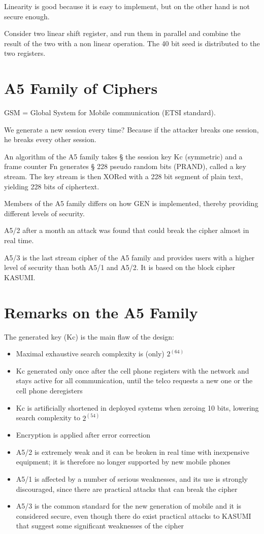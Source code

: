 Linearity is good because it is easy to implement, but on the other hand is not secure enough.


Consider two linear shift register, and run them in parallel and combine the result of the two with a non linear operation. The 40 bit seed is distributed to the two registers.



\section{A5 Family of Ciphers}

GSM = Global System for Mobile communication (ETSI standard).

We generate a new session every time? Because if the attacker breaks one session, he breaks every other session.


An algorithm of the A5 family takes § the session key Kc (symmetric) and a frame counter Fn generates § 228 pseudo random bits (PRAND), called a key stream.
The key stream is then XORed with a 228 bit segment of plain text, yielding 228 bits of ciphertext.

Members of the A5 family differs on how GEN is implemented, thereby providing different levels of security.


A5/2 after a month an attack was found that could break the cipher almost in real time.

A5/3 is the last stream cipher of the A5 family and provides users with a higher level of security than both A5/1 and A5/2. It is based on the block cipher KASUMI. 


\section{Remarks on the A5 Family}

The generated key (Kc) is the main flaw of the design:
\begin{itemize}
	\item Maximal exhaustive search complexity is (only) $2^(64)$
	\item  Kc generated only once after the cell phone registers with the network and stays active for all communication, until the telco requests a new one or the cell phone deregisters 
	\item Kc is artificially shortened in deployed systems when zeroing 10 bits, lowering search complexity to $2^(54)$
	\item Encryption is applied after error correction
	\item A5/2 is extremely weak and it can be broken in real time with inexpensive equipment; it is therefore no longer supported by new mobile phones
	\item A5/1 is affected by a number of serious weaknesses, and its use is strongly discouraged, since there are practical attacks that can break the cipher
	\item  A5/3 is the common standard for the new generation of mobile and it is considered secure, even though there do exist practical attacks to KASUMI that suggest some significant weaknesses of the cipher
\end{itemize}

